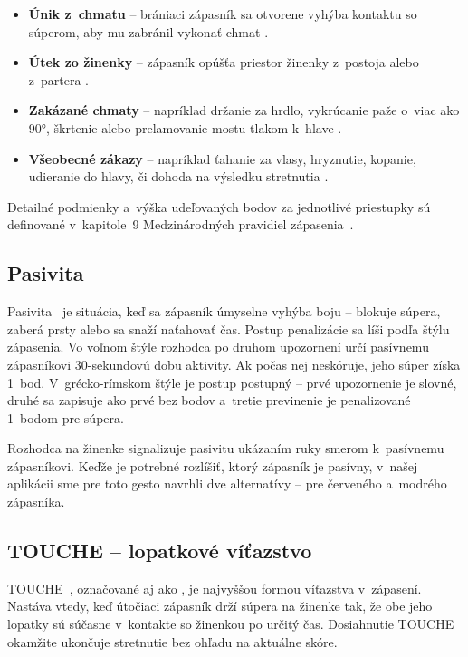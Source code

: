 \begin{itemize}
  \item \textbf{Únik z~chmatu} -- brániaci zápasník
        sa otvorene vyhýba kontaktu so súperom, aby
        mu zabránil vykonať chmat
        \cite[čl.~50]{zapasenie_pravidla}.
  \item \textbf{Útek zo žinenky} -- zápasník opúšťa
        priestor žinenky z~postoja alebo z~partera
        \cite[čl.~51]{zapasenie_pravidla}.
  \item \textbf{Zakázané chmaty} -- napríklad držanie
        za hrdlo, vykrúcanie paže o~viac ako 90°,
        škrtenie alebo prelamovanie mostu tlakom
        k~hlave \cite[čl.~52]{zapasenie_pravidla}.
  \item \textbf{Všeobecné zákazy} -- napríklad ťahanie
        za vlasy, hryznutie, kopanie, udieranie do
        hlavy, či dohoda na výsledku stretnutia
        \cite[čl.~49]{zapasenie_pravidla}.
\end{itemize}

Detailné podmienky a~výška udeľovaných bodov za jednotlivé
priestupky sú definované v~kapitole~9 Medzinárodných pravidiel
zápasenia~\cite{zapasenie_pravidla}.

\subsection{Pasivita}

Pasivita~\cite[čl.~48]{zapasenie_pravidla} je situácia,
keď sa zápasník úmyselne vyhýba boju -- blokuje súpera,
zaberá prsty alebo sa snaží naťahovať čas. Postup
penalizácie sa líši podľa štýlu zápasenia. Vo voľnom
štýle rozhodca po druhom upozornení určí pasívnemu
zápasníkovi 30-sekundovú dobu aktivity. Ak počas nej
neskóruje, jeho súper získa 1~bod. V~grécko-rímskom
štýle je postup postupný -- prvé upozornenie je slovné,
druhé sa zapisuje ako prvé  bez bodov a~tretie
previnenie je penalizované 1~bodom pre súpera.

Rozhodca na žinenke signalizuje pasivitu ukázaním
ruky smerom k~pasívnemu zápasníkovi. Keďže je
potrebné rozlíšiť, ktorý zápasník je pasívny,
v~našej aplikácii sme pre toto gesto navrhli dve
alternatívy -- pre červeného a~modrého zápasníka.

\subsection{TOUCHE -- lopatkové víťazstvo}

TOUCHE~\cite{zapasenie_pravidla}, označované aj ako
, je najvyššou formou víťazstva
v~zápasení. Nastáva vtedy, keď útočiaci zápasník drží
súpera na žinenke tak, že obe jeho lopatky sú súčasne
v~kontakte so žinenkou po určitý čas. Dosiahnutie TOUCHE
okamžite ukončuje stretnutie bez ohľadu na aktuálne skóre.

